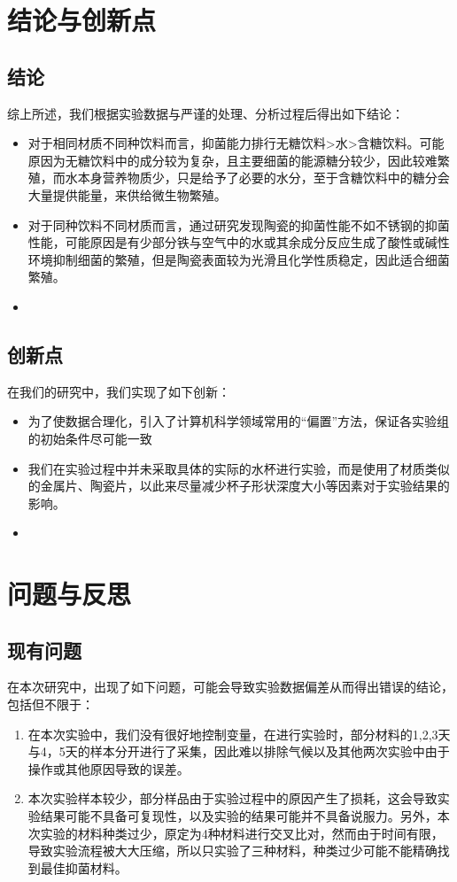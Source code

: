 \documentclass[12pt,a4paper]{ctexart}
\begin{document}
\section{结论与创新点}
\subsection{结论}
综上所述，我们根据实验数据与严谨的处理、分析过程后得出如下结论：
\begin{itemize}
    \item 对于相同材质不同种饮料而言，抑菌能力排行无糖饮料>水>含糖饮料。可能原因为无糖饮料中的成分较为复杂，且主要细菌的能源糖分较少，因此较难繁殖，而水本身营养物质少，只是给予了必要的水分，至于含糖饮料中的糖分会大量提供能量，来供给微生物繁殖。
    \item 对于同种饮料不同材质而言，通过研究发现陶瓷的抑菌性能不如不锈钢的抑菌性能，可能原因是有少部分铁与空气中的水或其余成分反应生成了酸性或碱性环境抑制细菌的繁殖，但是陶瓷表面较为光滑且化学性质稳定，因此适合细菌繁殖。
    \item 
\end{itemize}

\subsection{创新点}
在我们的研究中，我们实现了如下创新：
\begin{itemize}
    \item 为了使数据合理化，引入了计算机科学领域常用的“偏置”方法，保证各实验组的初始条件尽可能一致
    \item 我们在实验过程中并未采取具体的实际的水杯进行实验，而是使用了材质类似的金属片、陶瓷片，以此来尽量减少杯子形状深度大小等因素对于实验结果的影响。
    \item %
\end{itemize}

\section{问题与反思}\label{sec:problem}
\subsection{现有问题}
在本次研究中，出现了如下问题，可能会导致实验数据偏差从而得出错误的结论，包括但不限于：
\begin{enumerate}
    \item 在本次实验中，我们没有很好地控制变量，在进行实验时，部分材料的1,2,3天与4，5天的样本分开进行了采集，因此难以排除气候以及其他两次实验中由于操作或其他原因导致的误差。
    \item 本次实验样本较少，部分样品由于实验过程中的原因产生了损耗，这会导致实验结果可能不具备可复现性，以及实验的结果可能并不具备说服力。另外，本次实验的材料种类过少，原定为4种材料进行交叉比对，然而由于时间有限，导致实验流程被大大压缩，所以只实验了三种材料，种类过少可能不能精确找到最佳抑菌材料。
\end{enumerate}
\end{document}
